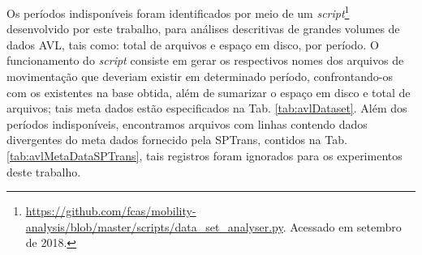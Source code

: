\documentclass[
	12pt,				%
	oneside,			%
	a4paper,			%
	english,			%
	brazil				%
	]{abntex2ppgsi}
\begin{document}
{{Os períodos indisponíveis foram identificados por meio de um \textit{script}\footnote{\url{https://github.com/fcas/mobility-analysis/blob/master/scripts/data_set_analyser.py}. Acessado em setembro de 2018.} desenvolvido por este trabalho, para análises descritivas de grandes volumes de dados AVL, tais como: total de arquivos e espaço em disco, por período. O funcionamento do \textit{script} consiste em gerar os respectivos nomes dos arquivos de movimentação que deveriam existir em determinado período, confrontando-os com os existentes na base obtida, além de sumarizar o espaço em disco e total de arquivos; tais meta dados estão especificados na Tab. \ref{tab:avlDataset}. Além dos períodos indisponíveis, encontramos arquivos com linhas contendo dados divergentes do meta dados fornecido pela SPTrans, contidos na Tab. \ref{tab:avlMetaDataSPTrans}, tais registros foram ignorados para os experimentos deste trabalho.

}}
\end{document}

